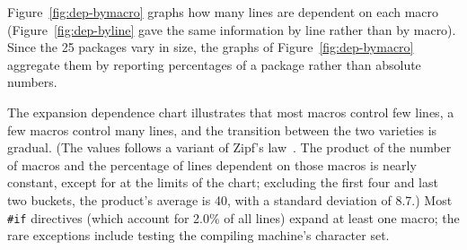 \documentclass[10pt]{article}
\def\numdependpackages{25}
\begin{document}
Figure~\ref{fig:dep-bymacro} graphs how many lines are dependent on each
macro (Figure~\ref{fig:dep-byline} gave the same information by line rather
than by macro).  Since the {\numdependpackages} packages vary in size, the
graphs of Figure~\ref{fig:dep-bymacro} aggregate them by reporting
percentages of a package rather than absolute numbers.




The expansion dependence chart illustrates that most macros control few
lines, a few macros control many lines, and the transition between the two
varieties is gradual.  (The values follows a variant of Zipf's
law~\cite{Zipf49}.  The product of the number of macros and the percentage
of lines dependent on those macros is nearly constant, except for at the
limits of the chart; excluding the first four and last two buckets, the
product's average is 40, with a standard deviation of 8.7.)  Most {\tt
\#if} directives (which account for 2.0\% of all lines) expand at
least one macro; the rare exceptions include testing the compiling
machine's character set.

\end{document}
